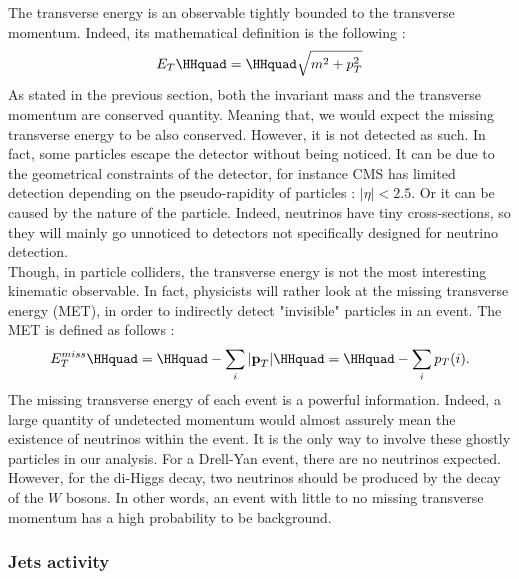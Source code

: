 The transverse energy is an observable tightly bounded to the transverse momentum. Indeed, its mathematical definition is the following :
\begin{equation}
    E_T \HHquad = \HHquad \sqrt{m^2 + p_T^2}
\end{equation}
As stated in the previous section, both the invariant mass and the transverse momentum are conserved quantity. Meaning that, we would expect the missing transverse energy to be also conserved. However, it is not detected as such. In fact, some particles escape the detector without being noticed. It can be due to the geometrical constraints of the detector, for instance CMS has limited detection depending on the pseudo-rapidity of particles : $|\eta| < 2.5$. Or it can be caused by the nature of the particle. Indeed, neutrinos have tiny cross-sections, so they will mainly go unnoticed to detectors not specifically designed for neutrino detection.\\
Though, in particle colliders, the transverse energy is not the most interesting kinematic observable. In fact, physicists will rather look at the missing transverse energy (MET), in order to indirectly detect "invisible" particles in an event. The MET is defined as follows :
\begin{equation}
    E^{miss}_T \HHquad = \HHquad - \sum_i |\textbf{p}_T| \HHquad = \HHquad - \sum_i p_T(i).
\end{equation}
The missing transverse energy of each event is a powerful information. Indeed, a large quantity of undetected momentum would almost assurely mean the existence of neutrinos within the event. It is the only way to involve these ghostly particles in our analysis. For a Drell-Yan event, there are no neutrinos expected. However, for the di-Higgs decay, two neutrinos should be produced by the decay of the $W$ bosons. In other words, an event with little to no missing transverse momentum has a high probability to be background.

\subsubsection*{Jets activity}


